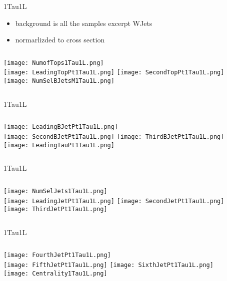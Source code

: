 \documentclass{beamer}
\begin{document}
\begin{frame}{1Tau1L}
    \begin{itemize}
    \item
    background is all the samples excerpt WJets
    \item
    normarlizded to cross section
    \end{itemize}
    \begin{columns}[t]
    \centering
    \texttt{[image: NumofTops1Tau1L.png]}\\
    \texttt{[image: LeadingTopPt1Tau1L.png]}
    \centering
    \texttt{[image: SecondTopPt1Tau1L.png]}\\
    \texttt{[image: NumSelBJetsM1Tau1L.png]}
    \end{columns}
\end{frame}
\begin{frame}{1Tau1L}
    \begin{columns}[t]
    \centering
    \texttt{[image: LeadingBJetPt1Tau1L.png]}\\
    \texttt{[image: SecondBJetPt1Tau1L.png]}
    \centering
    \texttt{[image: ThirdBJetPt1Tau1L.png]}\\
    \texttt{[image: LeadingTauPt1Tau1L.png]}
    \end{columns}
\end{frame}
\begin{frame}{1Tau1L}
    \begin{columns}[t]
    \centering
    \texttt{[image: NumSelJets1Tau1L.png]}\\
    \texttt{[image: LeadingJetPt1Tau1L.png]}
    \centering
    \texttt{[image: SecondJetPt1Tau1L.png]}\\
    \texttt{[image: ThirdJetPt1Tau1L.png]}
    \end{columns}
\end{frame}
\begin{frame}{1Tau1L}
    \begin{columns}[t]
    \centering
    \texttt{[image: FourthJetPt1Tau1L.png]}\\
    \texttt{[image: FifthJetPt1Tau1L.png]}
    \centering
    \texttt{[image: SixthJetPt1Tau1L.png]}\\
    \texttt{[image: Centrality1Tau1L.png]}
    \end{columns}
\end{frame}
\end{document}
